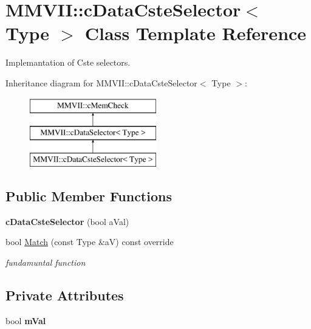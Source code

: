 \hypertarget{classMMVII_1_1cDataCsteSelector}{}\section{M\+M\+V\+II\+:\+:c\+Data\+Cste\+Selector$<$ Type $>$ Class Template Reference}
\label{classMMVII_1_1cDataCsteSelector}


Implemantation of Cste selectors.  


Inheritance diagram for M\+M\+V\+II\+:\+:c\+Data\+Cste\+Selector$<$ Type $>$\+:\begin{figure}[H]
\begin{center}
\leavevmode
\includegraphics[height=3.000000cm]{classMMVII_1_1cDataCsteSelector}
\end{center}
\end{figure}
\subsection*{Public Member Functions}
\begin{DoxyCompactItemize}
\item 
{\bfseries c\+Data\+Cste\+Selector} (bool a\+Val)\hypertarget{classMMVII_1_1cDataCsteSelector_ac1701a5b9f51b999b1826561c686256a}{}\label{classMMVII_1_1cDataCsteSelector_ac1701a5b9f51b999b1826561c686256a}

\item 
bool \hyperlink{classMMVII_1_1cDataCsteSelector_aca150442713a7fee806af191261310c7}{Match} (const Type \&aV) const override\hypertarget{classMMVII_1_1cDataCsteSelector_aca150442713a7fee806af191261310c7}{}\label{classMMVII_1_1cDataCsteSelector_aca150442713a7fee806af191261310c7}

\begin{DoxyCompactList}\small\item\em fundamuntal function \end{DoxyCompactList}\end{DoxyCompactItemize}
\subsection*{Private Attributes}
\begin{DoxyCompactItemize}
\item 
bool {\bfseries m\+Val}\hypertarget{classMMVII_1_1cDataCsteSelector_a0bb2e2ae904384f3f9fe3793dc68d469}{}\label{classMMVII_1_1cDataCsteSelector_a0bb2e2ae904384f3f9fe3793dc68d469}

\end{DoxyCompactItemize}



